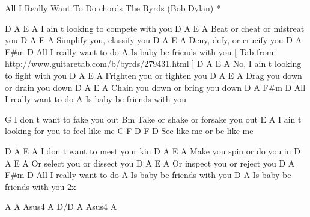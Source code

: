 
All I Really Want To Do chords
The Byrds (Bob Dylan) *

D       A             E         A
I ain t looking to compete with you
D       A        E        A
Beat or cheat or mistreat you
D     A       E     A 
Simplify you, classify you
D       A      E    A
Deny, defy, or crucify you
      D              A F#m D
All I really want to do
           A
Is baby be friends with you
[ Tab from: http://www.guitaretab.com/b/byrds/279431.html ]
D           A          E          A
No, I ain t looking to fight with you
D        A      E       A
Frighten you or tighten you
D        A       E         A
Drag you down or drain you down
D         A       E         A
Chain you down or bring you down
      D              A F#m D
All I really want to do
           A
Is baby be friends with you

G
I don t want to fake you out
Bm
Take or shake or forsake you out
E                          A
I ain t looking for you to feel like me
C              F       D  F D
See like me or be like me

D       A       E         A
I don t want to meet your kin
D        A       E      A
Make you spin or do you in
D    A        E     A
Or select you or dissect you
D     A        E    A
Or inspect you or reject you
      D              A F#m D
All I really want to do
           A
Is baby be friends with you
   D       A
Is baby be friends with you 2x

A A Asus4 A D/D A Asus4 A 

